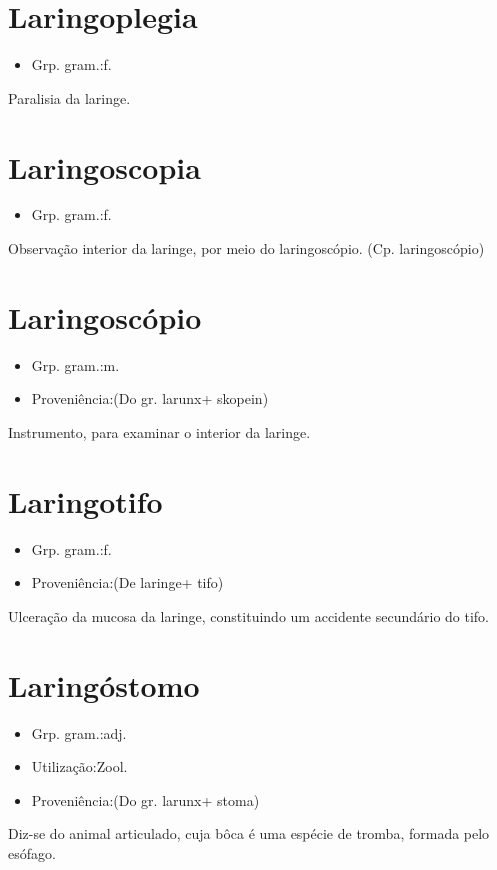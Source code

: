 \section{Laringoplegia}
\begin{itemize}
\item {Grp. gram.:f.}
\end{itemize}
Paralisia da laringe.
\section{Laringoscopia}
\begin{itemize}
\item {Grp. gram.:f.}
\end{itemize}
Observação interior da laringe, por meio do laringoscópio.
(Cp. \textunderscore laringoscópio\textunderscore )
\section{Laringoscópio}
\begin{itemize}
\item {Grp. gram.:m.}
\end{itemize}
\begin{itemize}
\item {Proveniência:(Do gr. \textunderscore larunx\textunderscore  + \textunderscore skopein\textunderscore )}
\end{itemize}
Instrumento, para examinar o interior da laringe.
\section{Laringotifo}
\begin{itemize}
\item {Grp. gram.:f.}
\end{itemize}
\begin{itemize}
\item {Proveniência:(De \textunderscore laringe\textunderscore  + \textunderscore tifo\textunderscore )}
\end{itemize}
Ulceração da mucosa da laringe, constituindo um accidente secundário do tifo.
\section{Laringóstomo}
\begin{itemize}
\item {Grp. gram.:adj.}
\end{itemize}
\begin{itemize}
\item {Utilização:Zool.}
\end{itemize}
\begin{itemize}
\item {Proveniência:(Do gr. \textunderscore larunx\textunderscore  + \textunderscore stoma\textunderscore )}
\end{itemize}
Diz-se do animal articulado, cuja bôca é uma espécie de tromba, formada pelo esófago.
